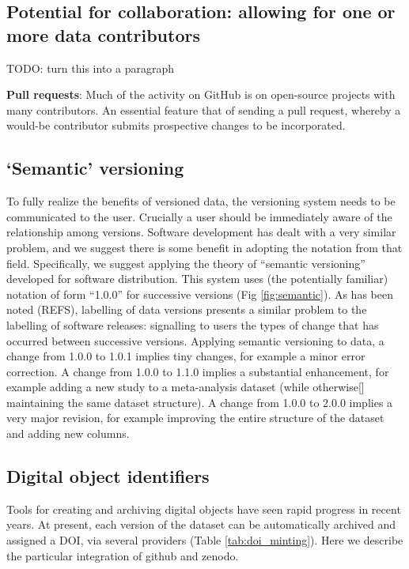 \documentclass[a4paper,11pt]{article}
\begin{document}
\subsection{Potential for collaboration: allowing for one or more data contributors}

TODO: turn this into a paragraph

\textbf{Pull requests}: Much of the activity on GitHub is on open-source projects with many contributors. An essential feature that of sending a pull request, whereby a would-be contributor submits prospective changes to be incorporated.

\subsection{`Semantic' versioning}

To fully realize the benefits of versioned data, the versioning system needs to be communicated to the user.  Crucially a user should be immediately aware of the relationship among versions.  Software development has dealt with a very similar problem, and we suggest there is some benefit in adopting the notation from that field.  Specifically, we suggest applying the theory of ``semantic versioning'' developed for software distribution. This system uses (the potentially familiar) notation of form ``1.0.0'' for successive versions (Fig \ref{fig:semantic}). As has been noted (REFS), labelling of data versions presents a similar problem to the labelling of software releases: signalling to users the types of change that has occurred between successive versions. Applying semantic versioning to data, a change from 1.0.0 to 1.0.1 implies tiny changes, for example a minor error correction. A change from 1.0.0 to 1.1.0 implies a substantial enhancement, for example adding a new study to a meta-analysis dataset (while otherwise[] maintaining the same dataset structure). A change from 1.0.0 to 2.0.0 implies a very major revision, for example improving the entire structure of the dataset and adding new columns.

\subsection{Digital object identifiers}


Tools for creating and archiving digital objects have seen rapid progress in recent years.  At present, each version of the dataset can be automatically archived and assigned a DOI, via several providers (Table \ref{tab:doi_minting}).  Here we describe the particular integration of github and zenodo.  
\end{document}
